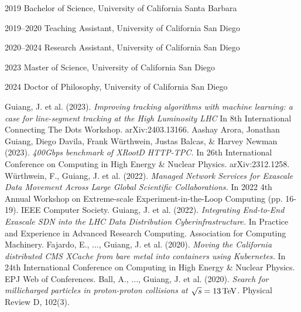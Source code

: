 \begin{vita}
\noindent
\begin{cv}{}
\begin{cvlist}{}
\item[2019] Bachelor of Science, University of California Santa Barbara
\item[2019--2020] Teaching Assistant, University of California San Diego
\item[2020--2024] Research Assistant, University of California San Diego
\item[2023] Master of Science, University of California San Diego
\item[2024] Doctor of Philosophy, University of California San Diego
\end{cvlist}
\end{cv}

\publications
\noindent Guiang, J. et al. (2023). 
\textit{Improving tracking algorithms with machine learning: a case for line-segment tracking at the High Luminosity LHC}
In 8th International Connecting The Dots Workshop. arXiv:2403.13166.
\newline
\newline
\noindent Aashay Arora, Jonathan Guiang, Diego Davila, Frank Würthwein, Justas Balcas, \& Harvey Newman (2023). 
\textit{400Gbps benchmark of XRootD HTTP-TPC.}
In 26th International Conference on Computing in High Energy \& Nuclear Physics. arXiv:2312.1258.
\newline
\newline
\noindent W\"urthwein, F., Guiang, J. et al. (2022). 
\textit{Managed Network Services for Exascale Data Movement Across Large Global Scientific Collaborations.}
In 2022 4th Annual Workshop on Extreme-scale Experiment-in-the-Loop Computing (pp. 16-19). IEEE Computer Society.
\newline
\newline
\noindent Guiang, J. et al. (2022). 
\textit{Integrating End-to-End Exascale SDN into the LHC Data Distribution Cyberinfrastructure.}
In Practice and Experience in Advanced Research Computing. Association for Computing Machinery.
\newline
\newline
\noindent Fajardo, E., ..., Guiang, J. et al. (2020). 
\textit{Moving the California distributed CMS XCache from bare metal into containers using Kubernetes.}
In 24th International Conference on Computing in High Energy \& Nuclear Physics. EPJ Web of Conferences.
\newline
\newline
\noindent Ball, A., ..., Guiang, J. et al. (2020). 
\textit{Search for millicharged particles in proton-proton collisions at $\sqrt{s} = 13\,\text{Te\hspace{-.08em}V}$.}
Physical Review D, 102(3).
\end{vita}
